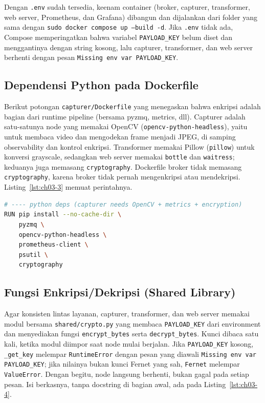 Dengan \texttt{.env} sudah tersedia, keenam container (broker, capturer, transformer, web server, Prometheus, dan Grafana) dibangun dan dijalankan dari folder yang sama dengan \texttt{sudo docker compose up --build -d}. Jika \texttt{.env} tidak ada, Compose memperingatkan bahwa variabel \texttt{PAYLOAD\_KEY} belum diset dan menggantinya dengan string kosong, lalu capturer, transformer, dan web server berhenti dengan pesan \texttt{Missing env var PAYLOAD\_KEY}.

\subsection*{Dependensi Python pada Dockerfile}

Berikut potongan \texttt{capturer/Dockerfile} yang menegaskan bahwa enkripsi adalah bagian dari runtime pipeline (bersama pyzmq, metrics, dll). Capturer adalah satu-satunya node yang memakai OpenCV (\texttt{opencv-python-headless}), yaitu untuk membaca video dan mengodekan frame menjadi JPEG, di samping observability dan kontrol enkripsi. Transformer memakai Pillow (\texttt{pillow}) untuk konversi grayscale, sedangkan web server memakai \texttt{bottle} dan \texttt{waitress}; keduanya juga memasang \texttt{cryptography}. Dockerfile broker tidak memasang \texttt{cryptography}, karena broker tidak pernah mengenkripsi atau mendekripsi. Listing~\ref{lst:ch03-3} memuat perintahnya.

\begin{lstlisting}[language=bash, caption={capturer/Dockerfile (excerpt): Python deps including cryptography}, label={lst:ch03-3}]
# ---- python deps (capturer needs OpenCV + metrics + encryption)
RUN pip install --no-cache-dir \
    pyzmq \
    opencv-python-headless \
    prometheus-client \
    psutil \
    cryptography
\end{lstlisting}

\subsection*{Fungsi Enkripsi/Dekripsi (Shared Library)}

Agar konsisten lintas layanan, capturer, transformer, dan web server memakai modul bersama \texttt{shared/crypto.py} yang membaca \texttt{PAYLOAD\_KEY} dari environment dan menyediakan fungsi \texttt{encrypt\_bytes} serta \texttt{decrypt\_bytes}. Kunci dibaca satu kali, ketika modul diimpor saat node mulai berjalan. Jika \texttt{PAYLOAD\_KEY} kosong, \texttt{\_get\_key} melempar \texttt{RuntimeError} dengan pesan yang diawali \texttt{Missing env var PAYLOAD\_KEY}; jika nilainya bukan kunci Fernet yang sah, \texttt{Fernet} melempar \texttt{ValueError}. Dengan begitu, node langsung berhenti, bukan gagal pada setiap pesan. Isi berkasnya, tanpa docstring di bagian awal, ada pada Listing~\ref{lst:ch03-4}.

